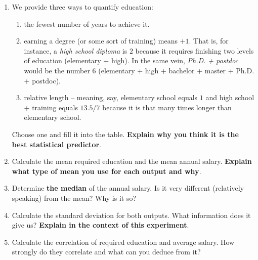 \documentclass[a4paper,11pt]{article}
\begin{document}
\begin{enumerate}
 \item We provide three ways to quantify education:
  \begin{enumerate}
   \item the fewest number of years to achieve it.
   \item earning a degree (or some sort of training) means $+1$. That is, for
    instance, a \emph{high school diploma} is $2$ because it requires finishing
    two levels of education (elementary + high). In the same vein, \emph{Ph.D. +
    postdoc} would be the number $6$ (elementary + high + bachelor + master +
    Ph.D. + postdoc).
   \item relative length -- meaning, say, elementary school equals $1$ and high
    school + training equals $13.5 / 7$ because it is that many times longer than
    elementary school.
  \end{enumerate}
  Choose one and fill it into the table. \textbf{Explain why you think it is the
  best statistical predictor}.
 \item Calculate the mean required education and the mean annual salary.
  \textbf{Explain what type of mean you use for each output and why}.
 \item Determine \textbf{the median} of the annual salary. Is it very different
  (relatively speaking) from the mean? Why is it so?
 \item Calculate the standard deviation for both outputs. What information does
  it give us? \textbf{Explain in the context of this experiment}.
 \item Calculate the correlation of required education and average salary. How
  strongly do they correlate and what can you deduce from it?
\end{enumerate}
\end{document}
